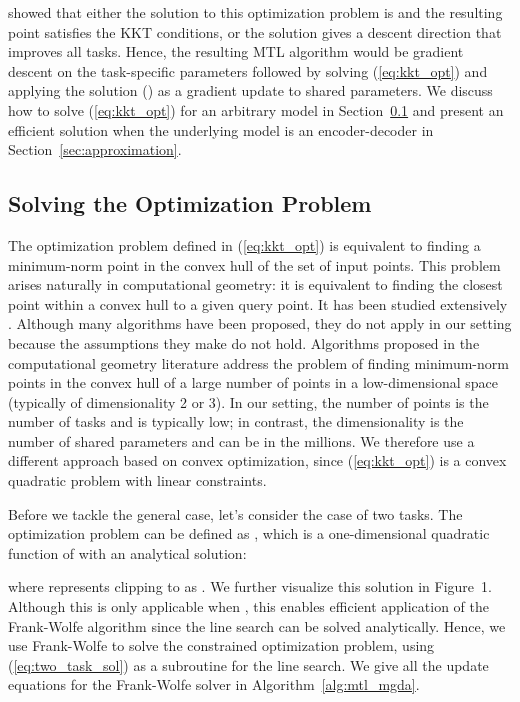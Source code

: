 \documentclass{article}
\begin{document}
\citet{Desideri2012} showed that either the solution to this optimization problem is  and the resulting point satisfies the KKT conditions, or the solution gives a descent direction that improves all tasks. Hence, the resulting MTL algorithm would be gradient descent on the task-specific parameters followed by solving (\ref{eq:kkt_opt}) and applying the solution () as a gradient update to shared parameters. We discuss how to solve (\ref{eq:kkt_opt}) for an arbitrary model in Section~\ref{sec:optimization} and present an efficient solution when the underlying model is an encoder-decoder in Section~\ref{sec:approximation}.

\subsection{Solving the Optimization Problem}
\label{sec:optimization}

The optimization problem defined in (\ref{eq:kkt_opt}) is equivalent to finding a minimum-norm point in the convex hull of the set of input points. This problem arises naturally in computational geometry: it is equivalent to finding the closest point within a convex hull to a given query point. It has been studied extensively \citep{Makimoto1994, Wolfe1976, Sekitani1993}. Although many algorithms have been proposed, they do not apply in our setting because the assumptions they make do not hold. Algorithms proposed in the computational geometry literature address the problem of finding minimum-norm points in the convex hull of a large number of points in a low-dimensional space (typically of dimensionality 2 or 3). In our setting, the number of points is the number of tasks and is typically low; in contrast, the dimensionality is the number of shared parameters and can be in the millions. We therefore use a different approach based on convex optimization, since (\ref{eq:kkt_opt}) is a convex quadratic problem with linear constraints.

Before we tackle the general case, let's consider the case of two tasks. The optimization problem can be defined as \mbox{}, which is a one-dimensional quadratic function of  with an analytical solution:

where  represents clipping to  as . We further visualize this solution in Figure~1. Although this is only applicable when , this enables efficient application of the Frank-Wolfe algorithm \citep{Jaggi2013} since the line search can be solved analytically. Hence, we use Frank-Wolfe to solve the constrained optimization problem, using (\ref{eq:two_task_sol}) as a subroutine for the line search. We give all the update equations for the Frank-Wolfe solver in Algorithm~\ref{alg:mtl_mgda}.
\end{document}

